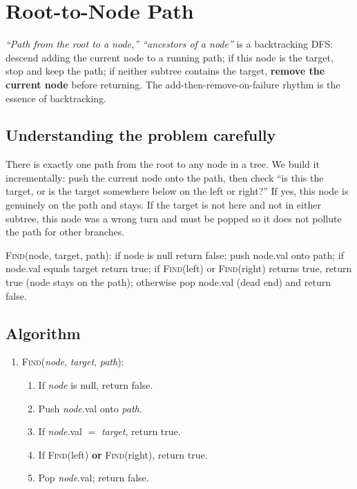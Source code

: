 \section{Root-to-Node Path}
\label{sec:trees-root-to-node-path}


\begin{patternbox}
\emph{``Path from the root to a node,'' ``ancestors of a node''} is a
backtracking DFS: descend adding the current node to a running path; if
this node is the target, stop and keep the path; if neither subtree
contains the target, \textbf{remove the current node} before returning. The
add-then-remove-on-failure rhythm is the essence of backtracking.
\end{patternbox}

\subsection*{Understanding the problem carefully}

There is exactly one path from the root to any node in a tree. We build it
incrementally: push the current node onto the path, then check ``is this
the target, or is the target somewhere below on the left or right?'' If
yes, this node is genuinely on the path and stays. If the target is not
here and not in either subtree, this node was a wrong turn and must be
popped so it does not pollute the path for other branches.

\begin{ideabox}
\textsc{Find}(node, target, path): if node is null return false; push
node.val onto path; if node.val equals target return true; if
\textsc{Find}(left) or \textsc{Find}(right) returns true, return true
(node stays on the path); otherwise pop node.val (dead end) and return
false.
\end{ideabox}

\subsection*{Algorithm}

\begin{enumerate}
  \item \textsc{Find}(\textit{node}, \textit{target}, \textit{path}):
  \begin{enumerate}
    \item If \textit{node} is null, return false.
    \item Push \textit{node}.val onto \textit{path}.
    \item If \textit{node}.val $=$ \textit{target}, return true.
    \item If \textsc{Find}(left) \textbf{or} \textsc{Find}(right),
          return true.
    \item Pop \textit{node}.val; return false.
  \end{enumerate}
\end{enumerate}


